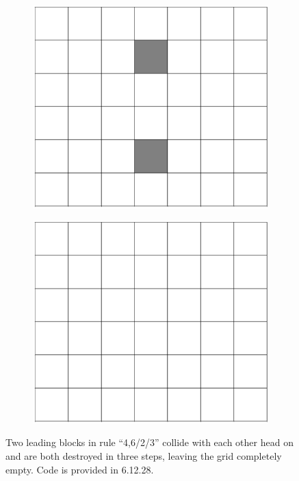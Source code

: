 \documentclass[12pt]{article}
\numberwithin{figure}{section} %
\begin{document}
\begin{figure}[H]
     	\begin{subfigure}{0.23\textwidth}
     	\centering
     	\includegraphics[width=\linewidth]{Section4/31.2}
     	\subcaption{}
   	\end{subfigure}
        	\begin{subfigure}{0.23\textwidth}
     	\centering
     	\includegraphics[width=\linewidth]{Section4/31.3}
     	\subcaption{}
   	\end{subfigure}
   \caption{Two leading blocks in rule “4,6/2/3” collide with each other head on and are both destroyed in three steps, leaving the grid completely empty. Code is provided in 6.12.28. }
   \label{fig:glider all dead}
\end{figure}
\end{document}
